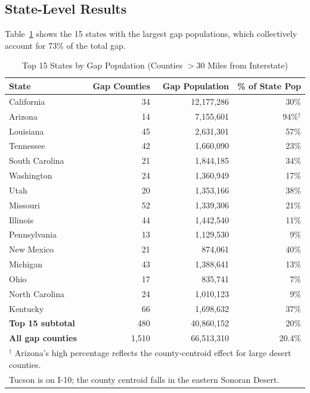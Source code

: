 \subsection{State-Level Results}

Table~\ref{tab:states} shows the 15 states with the largest gap populations, which collectively account for 73\% of the total gap.

\begin{table}[h!]
\centering
\caption{Top 15 States by Gap Population (Counties $> 30$ Miles from Interstate)}
\label{tab:states}
\begin{tabular}{lrrr}
\toprule
\textbf{State} & \textbf{Gap Counties} & \textbf{Gap Population} & \textbf{\% of State Pop} \\
\midrule
California & 34 & 12,177,286 & 30\% \\
Arizona & 14 & 7,155,601 & 94\%$^\dagger$ \\
Louisiana & 45 & 2,631,301 & 57\% \\
Tennessee & 42 & 1,660,090 & 23\% \\
South Carolina & 21 & 1,844,185 & 34\% \\
Washington & 24 & 1,360,949 & 17\% \\
Utah & 20 & 1,353,166 & 38\% \\
Missouri & 52 & 1,339,306 & 21\% \\
Illinois & 44 & 1,442,540 & 11\% \\
Pennsylvania & 13 & 1,129,530 & 9\% \\
New Mexico & 21 & 874,061 & 40\% \\
Michigan & 43 & 1,388,641 & 13\% \\
Ohio & 17 & 835,741 & 7\% \\
North Carolina & 24 & 1,010,123 & 9\% \\
Kentucky & 66 & 1,698,632 & 37\% \\
\midrule
\textbf{Top 15 subtotal} & 480 & 40,860,152 & 20\% \\
\textbf{All gap counties} & 1,510 & 66,513,310 & 20.4\% \\
\bottomrule
\multicolumn{4}{l}{$^\dagger$ Arizona's high percentage reflects the county-centroid effect for large desert counties.} \\
\multicolumn{4}{l}{Tucson is on I-10; the county centroid falls in the eastern Sonoran Desert.} \\
\end{tabular}
\end{table}


